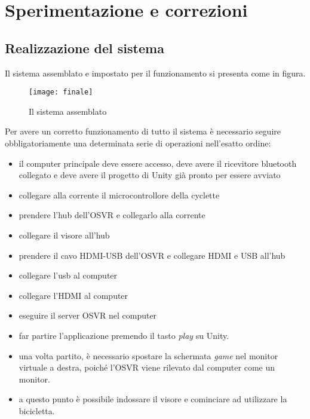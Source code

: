 \chapter{Sperimentazione e correzioni}
\label{sperimentazione}
\thispagestyle{empty}



\section{Realizzazione del sistema}
Il sistema assemblato e impostato per il funzionamento si presenta come in figura.
 \begin{figure}[htb]
    \centering
    \vspace{-0.7cm}
    \texttt{[image: finale]}
    \caption{Il sistema assemblato\label{fig:finale}}
\end{figure}
\newpage
\noindent Per avere un corretto funzionamento di tutto il sistema è necessario seguire obbligatoriamente una determinata serie di operazioni nell'esatto ordine:
\begin{itemize}
  \item il computer principale deve essere accesso, deve avere il ricevitore bluetooth collegato e deve avere il progetto di Unity già pronto per essere avviato
  \item collegare alla corrente il microcontrollore della cyclette
  \item prendere l'hub dell'OSVR e collegarlo alla corrente
  \item collegare il visore all'hub
  \item prendere il cavo HDMI-USB dell'OSVR e collegare HDMI e USB all'hub
  \item collegare l'usb al computer
  \item collegare l'HDMI al computer
  \item eseguire il server OSVR nel computer
  \item far partire l'applicazione premendo il tasto \textit{play} su Unity.
  \item una volta partito, è necessario spostare la schermata \textit{game} nel monitor virtuale a destra, poiché l'OSVR viene rilevato dal computer come un monitor.
  \item a questo punto è possibile indossare il visore e cominciare ad utilizzare la bicicletta.
\end{itemize}

